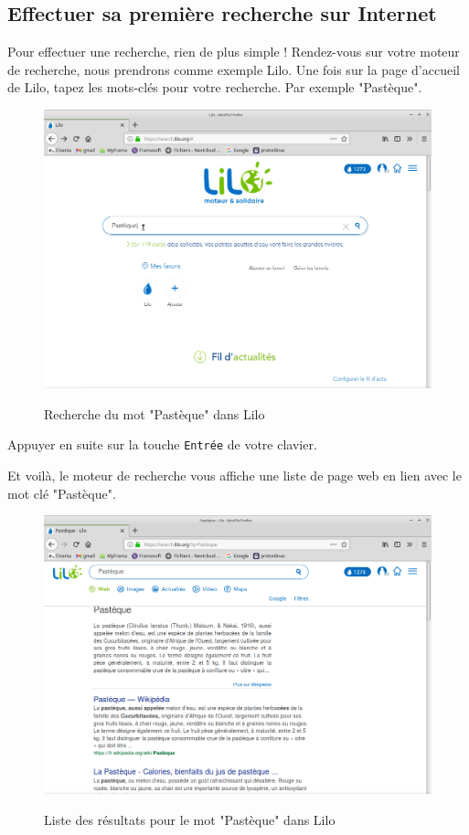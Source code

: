 \documentclass[12pt]{book}
\begin{document}
	\subsection{Effectuer sa première recherche sur Internet}
		Pour effectuer une recherche, rien de plus simple ! 
		Rendez-vous sur votre moteur de recherche, nous prendrons comme exemple Lilo.
		Une fois sur la page d'accueil de Lilo, tapez les mots-clés pour votre recherche.
		Par exemple "Pastèque".
		\begin{figure}[h]
			\centering
			\includegraphics[scale=0.3]{include/pasteque1.png}
			\label{fig:pasteque1}
			\caption{Recherche du mot "Pastèque" dans Lilo}
		\end{figure}
		Appuyer en suite sur la touche \texttt{Entrée} de votre clavier.\par
		Et voilà, le moteur de recherche vous affiche une liste de page web en lien avec le mot clé "Pastèque".
		\begin{figure}[h]
			\centering
			\includegraphics[scale=0.3]{include/pasteque2.png}
			\label{fig:pasteque2}
			\caption{Liste des résultats pour le mot "Pastèque" dans Lilo}
		\end{figure}
\end{document}
